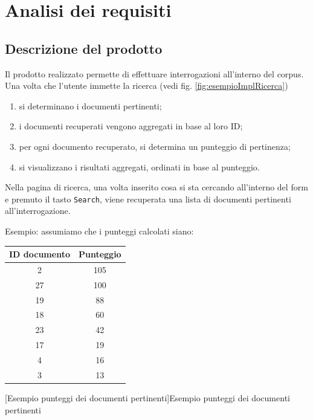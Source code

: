 
\chapter{Analisi dei requisiti}
\label{cap:analisi-requisiti}

\section{Descrizione del prodotto}
\label{sec:descrizioneProdotto}
Il prodotto realizzato permette di effettuare interrogazioni all'interno del \gls{corpus}. Una volta che l'utente immette la ricerca (vedi fig. \ref{fig:esempioImplRicerca})
\begin{enumerate}
    \item si determinano i documenti pertinenti;
    \item i documenti recuperati vengono aggregati in base al loro ID;
    \item per ogni documento recuperato, si determina un punteggio di pertinenza;
    \item si visualizzano i risultati aggregati, ordinati in base al punteggio.
\end{enumerate}

Nella pagina di ricerca, una volta inserito cosa si sta cercando all'interno del form e premuto il tasto \texttt{Search}, viene recuperata una lista di documenti pertinenti all'interrogazione.

Esempio: assumiamo che i punteggi calcolati siano: 
\begin{center}
    \begin{tabular}{cc}
        \toprule
        ID documento & Punteggio \\
        \midrule
          2 & 105 \\
          27 & 100 \\
          19 & 88\\
          18 & 60\\
          23 & 42\\
          17 & 19\\
          4 & 16\\
          3 & 13\\
        \bottomrule
    \end{tabular}
        [Esempio punteggi dei documenti pertinenti]{Esempio punteggi dei documenti pertinenti} 
        \label{tab:punteggiDocumentiPertinenti}
    \end{center}

